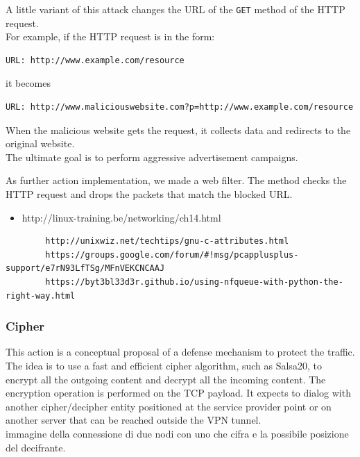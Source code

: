 \documentclass[12pt]{article}
\begin{document}
	\bigbreak
	A little variant of this attack changes the URL of the \lstinline{GET} method of the HTTP request.\\
	For example, if the HTTP request is in the form:\\
	
	\bigbreak
	\begin{lstlisting}[frame=single]
		URL: http://www.example.com/resource
	\end{lstlisting}
	\bigbreak
	
	it becomes
	
	\bigbreak
	\begin{lstlisting}[frame=single]
		URL: http://www.maliciouswebsite.com?p=http://www.example.com/resource
	\end{lstlisting}
	\bigbreak
	
	When the malicious website gets the request, it collects data and redirects to the original website.\\
	The ultimate goal is to perform aggressive advertisement campaigns.\\
	\bigbreak

	As further action implementation, we made a web filter. The method checks the HTTP request and drops the packets that match the blocked URL.
	
	\begin{itemize}
		\item http://linux-training.be/networking/ch14.html
	\end{itemize}

	\begin{verbatim}
		http://unixwiz.net/techtips/gnu-c-attributes.html
		https://groups.google.com/forum/#!msg/pcapplusplus-support/e7rN93LfTSg/MFnVEKCNCAAJ
		https://byt3bl33d3r.github.io/using-nfqueue-with-python-the-right-way.html
	\end{verbatim}

	\subsubsection{Cipher}

	This action is a conceptual proposal of a defense mechanism to protect the traffic. The idea is to use a fast and efficient cipher algorithm, such as Salsa20, to encrypt all the outgoing content and decrypt all the incoming content. The encryption operation is performed on the TCP payload. It expects to dialog with another cipher/decipher entity positioned at the service provider point or on another server that can be reached outside the VPN tunnel.\\
	\bigbreak
	immagine della connessione di due nodi con uno che cifra e la possibile posizione del decifrante.
	\bigbreak
\end{document}
